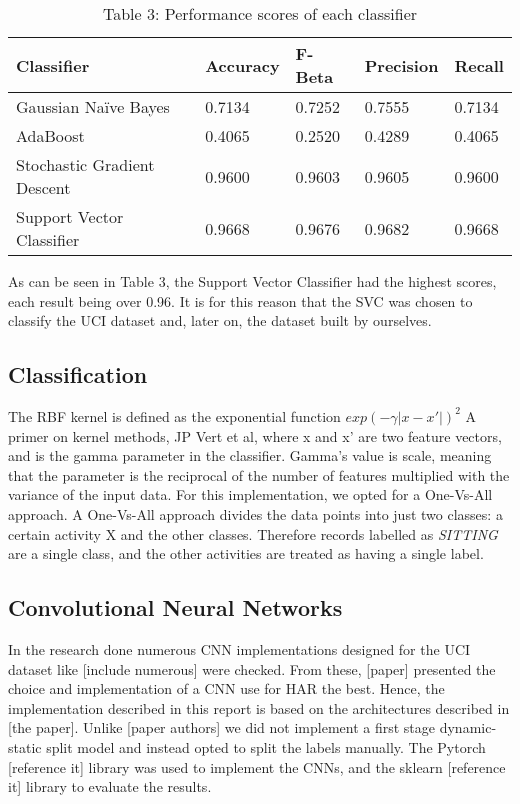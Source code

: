         \begin{table}[ht]
            \centering\footnotesize
            \begin{tabular}{|l|l|l|l|l|}
                \hline
                \textbf{Classifier} & \textbf{Accuracy} & \textbf{F-Beta}  & \textbf{Precision} & \textbf{Recall} \\ \hline
                Gaussian Naïve Bayes             & 0.7134           & 0.7252  & 0.7555 & 0.7134 \\ \hline
                AdaBoost            & 0.4065           & 0.2520 & 0.4289 & 0.4065 \\ \hline
                Stochastic Gradient Descent               & 0.9600           & 0.9603 & 0.9605 & 0.9600 \\ \hline
                Support Vector Classifier            & 0.9668           & 0.9676 & 0.9682 & 0.9668 \\ \hline
            \end{tabular}
            \caption*{Table 3: Performance scores of each classifier}
        \end{table}

        As can be seen in Table 3, the Support Vector Classifier had the highest scores, each result being over 0.96. It is for this reason that the SVC
        was chosen to classify the UCI dataset \cite{Anguita2013} and, later on, the dataset built by ourselves.

    \subsection{Classification}
        The RBF kernel is defined as the exponential function \(exp(-\gamma \lvert x-x' \rvert)^2\) A primer on kernel methods, JP Vert et al, where x and x’ are two feature vectors, and is the
        gamma parameter in the classifier. Gamma’s value is scale, meaning that the parameter is the reciprocal of the number of features multiplied with the variance of the input data.
        For this implementation, we opted for a One-Vs-All approach. A One-Vs-All approach divides the data points into just two classes: a certain activity X and the other classes. Therefore records
        labelled as \emph{SITTING} are a single class, and the other activities are treated as having a single label.

\subsection{Convolutional Neural Networks}
    In the research done numerous CNN implementations designed for the UCI dataset like [include numerous] were checked.
    From these, [paper] presented the choice and implementation of a CNN use for HAR the best.
    Hence, the implementation described in this report is based on the architectures described in [the paper].
    Unlike [paper authors] we did not  implement a first stage dynamic-static split model and instead opted to split the labels manually.
    The Pytorch [reference it] library was used to implement the CNNs, and the sklearn [reference it] library to evaluate the results.

